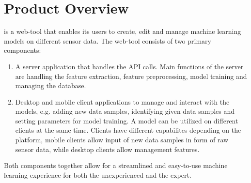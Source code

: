 \section{Product Overview}

 {\pseProjectName} is a web-tool that enables its users to create, edit and manage machine learning models on different sensor data. The web-tool consists of two primary components:

\begin{enumerate}
    \item A server application that handles the API calls. Main functions of the server are handling the feature extraction, feature preprocessing, model training and managing the database.
    \item Desktop and mobile client applications to manage and interact with the models, e.g. adding new data samples, identifying given data samples and setting parameters for model training. A model can be utilized on different clients at the same time. Clients have different capabilites depending on the platform, mobile clients allow input of new data samples in form of raw sensor data, while desktop clients allow management features.
\end{enumerate}

Both components together allow for a streamlined and easy-to-use machine learning experience for both the unexperienced and the expert.